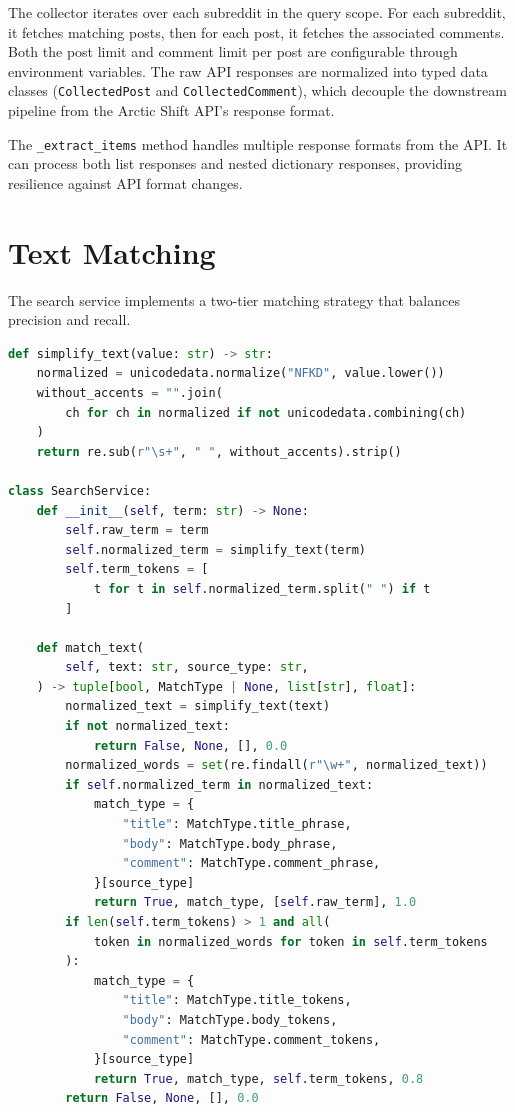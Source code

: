 The collector iterates over each subreddit in the query scope. For each subreddit, it fetches matching posts, then for each post, it fetches the associated comments. Both the post limit and comment limit per post are configurable through environment variables. The raw API responses are normalized into typed data classes (\texttt{CollectedPost} and \texttt{CollectedComment}), which decouple the downstream pipeline from the Arctic Shift API's response format.

The \texttt{\_extract\_items} method handles multiple response formats from the API. It can process both list responses and nested dictionary responses, providing resilience against API format changes.

\section{Text Matching}
\label{sec:text_matching}

The search service implements a two-tier matching strategy that balances precision and recall.

\begin{lstlisting}[language=Python, caption={Search service with phrase and token matching}]
def simplify_text(value: str) -> str:
    normalized = unicodedata.normalize("NFKD", value.lower())
    without_accents = "".join(
        ch for ch in normalized if not unicodedata.combining(ch)
    )
    return re.sub(r"\s+", " ", without_accents).strip()

class SearchService:
    def __init__(self, term: str) -> None:
        self.raw_term = term
        self.normalized_term = simplify_text(term)
        self.term_tokens = [
            t for t in self.normalized_term.split(" ") if t
        ]

    def match_text(
        self, text: str, source_type: str,
    ) -> tuple[bool, MatchType | None, list[str], float]:
        normalized_text = simplify_text(text)
        if not normalized_text:
            return False, None, [], 0.0
        normalized_words = set(re.findall(r"\w+", normalized_text))
        if self.normalized_term in normalized_text:
            match_type = {
                "title": MatchType.title_phrase,
                "body": MatchType.body_phrase,
                "comment": MatchType.comment_phrase,
            }[source_type]
            return True, match_type, [self.raw_term], 1.0
        if len(self.term_tokens) > 1 and all(
            token in normalized_words for token in self.term_tokens
        ):
            match_type = {
                "title": MatchType.title_tokens,
                "body": MatchType.body_tokens,
                "comment": MatchType.comment_tokens,
            }[source_type]
            return True, match_type, self.term_tokens, 0.8
        return False, None, [], 0.0
\end{lstlisting}

